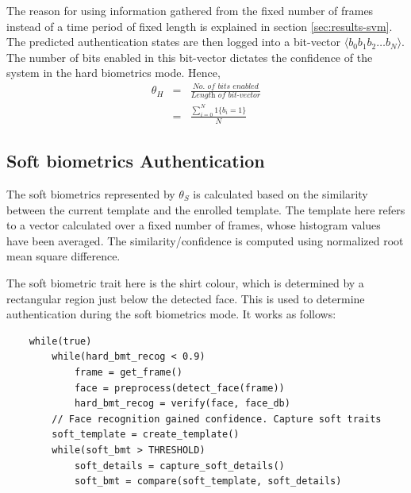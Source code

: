 \documentclass[12pt]{report}			%
\begin{document}
The reason for using information gathered from the fixed number of frames instead of a time period of fixed length is explained in section \ref{sec:results-svm}.
The predicted authentication states are then logged into a bit-vector $\langle b_0 b_1 b_2 \ldots b_N \rangle$.
The number of bits enabled in this bit-vector dictates the confidence of the system in the hard biometrics mode.
Hence,
\begin{eqnarray}
\theta_{H} & = & \frac {\textit{No. of bits enabled}} {\textit{Length of bit-vector}}\\
           & = & \frac{\sum_{i=0}^{N} 1\{b_i=1\}}{N}
\end{eqnarray}
\subsection{ Soft biometrics Authentication}

The soft biometrics represented by $\theta_{S}$ is calculated based on the similarity between the current template and the enrolled template.
The template here refers to a vector calculated over a fixed number of frames, whose histogram values have been averaged.
The similarity/confidence is computed using normalized root mean square difference.

The soft biometric trait here is the shirt colour, which is determined by a rectangular region just below the detected face. This is used to determine authentication during the soft biometrics mode. It works as follows:\\[2ex]

\begin{verbatim}
    while(true)
        while(hard_bmt_recog < 0.9)
            frame = get_frame()
            face = preprocess(detect_face(frame))
            hard_bmt_recog = verify(face, face_db)
        // Face recognition gained confidence. Capture soft traits
        soft_template = create_template()
        while(soft_bmt > THRESHOLD)
            soft_details = capture_soft_details()
            soft_bmt = compare(soft_template, soft_details)
\end{verbatim}
\end{document}

